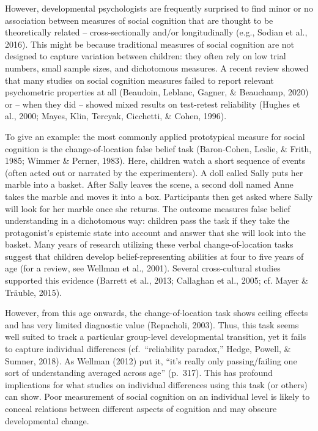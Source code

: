 \documentclass[
  man,floatsintext]{apa6}
\begin{document}
However, developmental psychologists are frequently surprised to find minor or no association between measures of social cognition that are thought to be theoretically related -- cross-sectionally and/or longitudinally (e.g., Sodian et al., 2016). This might be because traditional measures of social cognition are not designed to capture variation between children: they often rely on low trial numbers, small sample sizes, and dichotomous measures. A recent review showed that many studies on social cognition measures failed to report relevant psychometric properties at all (Beaudoin, Leblanc, Gagner, \& Beauchamp, 2020) or -- when they did -- showed mixed results on test-retest reliability (Hughes et al., 2000; Mayes, Klin, Tercyak, Cicchetti, \& Cohen, 1996).

To give an example: the most commonly applied prototypical measure for social cognition is the change-of-location false belief task (Baron-Cohen, Leslie, \& Frith, 1985; Wimmer \& Perner, 1983). Here, children watch a short sequence of events (often acted out or narrated by the experimenters). A doll called Sally puts her marble into a basket. After Sally leaves the scene, a second doll named Anne takes the marble and moves it into a box. Participants then get asked where Sally will look for her marble once she returns. The outcome measures false belief understanding in a dichotomous way: children pass the task if they take the protagonist's epistemic state into account and answer that she will look into the basket. Many years of research utilizing these verbal change-of-location tasks suggest that children develop belief-representing abilities at four to five years of age (for a review, see Wellman et al., 2001). Several cross-cultural studies supported this evidence (Barrett et al., 2013; Callaghan et al., 2005; cf. Mayer \& Träuble, 2015).

However, from this age onwards, the change-of-location task shows ceiling effects and has very limited diagnostic value (Repacholi, 2003). Thus, this task seems well suited to track a particular group-level developmental transition, yet it fails to capture individual differences (cf.~``reliability paradox,'' Hedge, Powell, \& Sumner, 2018).
As Wellman (2012) put it, ``it's really only passing/failing one sort of understanding averaged across age'' (p.~317).
This has profound implications for what studies on individual differences using this task (or others) can show.
Poor measurement of social cognition on an individual level is likely to conceal relations between different aspects of cognition and may obscure developmental change.
\end{document}
